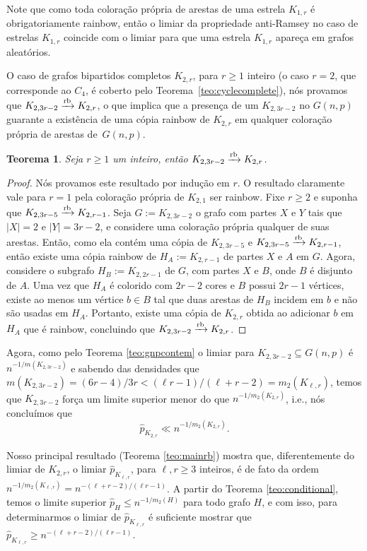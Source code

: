 \documentclass[12pt,a4paper]{book}
\newcommand{\K}{K_{\ell,r}} %
\newcommand{\rb}{\xrightarrow{\text{\rm rb}}}
\let\subset\subseteq
\newtheorem{teorema}{Teorema}[chapter]
\begin{document}
    Note que como toda coloração própria de arestas de uma estrela $K_{1,r}$ é obrigatoriamente rainbow, então
    o limiar da propriedade anti-Ramsey no caso de estrelas $K_{1,r}$ coincide com o limiar para que uma estrela $K_{1,r}$ apareça em grafos aleatórios.

    O caso de grafos bipartidos completos $K_{2,r}$, para $r\geq 1$ inteiro (o caso $r=2$, que corresponde ao $C_4$, é coberto pelo
    Teorema~\ref{teo:cyclecomplete}),
    nós provamos que $K_{2,3r-2} \rb K_{2,r}$, 
    o que implica que  a presença de um $K_{2,3r-2}$ no
    $G(n,p)$ guarante a existência de uma cópia rainbow de $K_{2,r}$ em qualquer coloração própria de arestas de~$G(n,p)$.  

     \begin{teorema}\label{teo:below} Seja $r\geq 1$ um inteiro, então
    $K_{2,3r-2} \rb K_{2,r}$.
     \end{teorema}
     \begin{proof} Nós provamos este resultado por indução em $r$. 
     O resultado claramente vale para $r=1$ pela coloração própria de $K_{2,1}$ ser rainbow. 
     Fixe $r\geq 2$ e suponha que $K_{2,3r-5} \rb K_{2,r-1}$. 
     Seja $G:=K_{2,3r-2}$ o grafo com partes $X$ e $Y$ tais que $|X|=2$ e $|Y|=3r-2$, e considere uma coloração própria qualquer de suas arestas.
     Então, como ela contém uma cópia de $K_{2,3r-5}$ e $K_{2,3r-5} \rb K_{2,r-1}$, então existe uma 
     cópia rainbow de $H_A:=K_{2,r-1}$ de partes $X$ e $A$ em $G$.
     Agora, considere  o subgrafo $H_B:=K_{2,2r-1}$ de $G$, com partes $X$ e $B$, onde $B$ é disjunto de $A$. 
     Uma vez que $H_A$ é colorido com $2r-2$ cores e $B$ possui
    $2r-1$ vértices, existe ao menos um vértice $b\in B$ tal que
    duas arestas de $H_B$ incidem em $b$ e não são usadas em $H_A$. 
    Portanto, existe uma cópia de $K_{2,r}$ obtida ao adicionar $b$ em $H_A$ que é rainbow, concluindo que  $K_{2,3r-2} \rb K_{2,r}$.
     \end{proof}
    
    Agora, como pelo Teorema \ref{teo:gnpcontem}  o limiar para
    $K_{2,3r-2}\subset G(n,p)$ é $n^{-1/m(K_{2,3r-2})}$ e sabendo das densidades que
    $m(K_{2,3r-2}) = (6r-4)/3r < (\ell r - 1)/(\ell+r-2) =
    m_2(K_{\ell,r})$, 
    temos que $K_{2,3r-2}$ força um limite superior menor do que
     $n^{-1/m_2(K_{2,r})}$, i.e., nós concluímos que
    \[ 
      \hat{p}_{K_{2,r}} \ll n^{-1/m_2(K_{2,r})}.
    \]

    Nosso principal resultado (Teorema \ref{teo:mainrb}) mostra que, diferentemente do limiar de $K_{2,r}$,
    o limiar $\hat{p}_{\K}$, para $\ell,r \geq 3$ inteiros, é de fato da ordem 
    $n^{-1/m_2(\K)} = n^{-(\ell+r-2)/(\ell r-1)}$.
    A partir do Teorema \ref{teo:conditional}, temos o limite superior $\hat{p}_H \leq n^{-1/m_2(H)}$ para todo grafo $H$, e com isso, para determinarmos o limiar de $\hat{p}_{\K}$ é suficiente mostrar que 
    $\hat{p}_{\K}\geq n^{-(\ell+r-2)/(\ell r - 1)}$.
\end{document}
